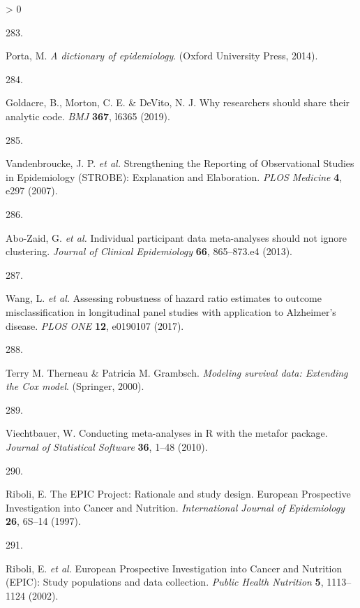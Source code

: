 \documentclass[a4paper, twoside]{templates/ociamthesis}
\newlength{\cslhangindent}
\newlength{\csllabelwidth}
\newenvironment{CSLReferences}[3] %
 {%
  \setlength{\parindent}{0pt}
  \ifodd #1 \everypar{\setlength{\hangindent}{\cslhangindent}}\ignorespaces\fi
  \ifnum #2 > 0
  \setlength{\parskip}{#2\baselineskip}
  \fi
 }%
 {}
\newcommand{\CSLLeftMargin}[1]{\parbox[t]{\maxof{\widthof{#1}}{\csllabelwidth}}{#1}}
\newcommand{\CSLRightInline}[1]{\parbox[t]{\linewidth - \csllabelwidth}{#1}}
\begin{document}
\begin{CSLReferences}{0}{0}
\leavevmode\hypertarget{ref-porta2014dictionary}{}%
\CSLLeftMargin{283. }
\CSLRightInline{Porta, M. \emph{A dictionary of epidemiology}. ({Oxford University Press}, 2014).}

\leavevmode\hypertarget{ref-goldacre2019c}{}%
\CSLLeftMargin{284. }
\CSLRightInline{Goldacre, B., Morton, C. E. \& DeVito, N. J. Why researchers should share their analytic code. \emph{BMJ} \textbf{367}, l6365 (2019).}

\leavevmode\hypertarget{ref-vandenbroucke2007}{}%
\CSLLeftMargin{285. }
\CSLRightInline{Vandenbroucke, J. P. \emph{et al.} Strengthening the {Reporting} of {Observational Studies} in {Epidemiology} ({STROBE}): {Explanation} and {Elaboration}. \emph{PLOS Medicine} \textbf{4}, e297 (2007).}

\leavevmode\hypertarget{ref-abo-zaid2013}{}%
\CSLLeftMargin{286. }
\CSLRightInline{Abo-Zaid, G. \emph{et al.} Individual participant data meta-analyses should not ignore clustering. \emph{Journal of Clinical Epidemiology} \textbf{66}, 865--873.e4 (2013).}

\leavevmode\hypertarget{ref-wang2017}{}%
\CSLLeftMargin{287. }
\CSLRightInline{Wang, L. \emph{et al.} Assessing robustness of hazard ratio estimates to outcome misclassification in longitudinal panel studies with application to {Alzheimer}'s disease. \emph{PLOS ONE} \textbf{12}, e0190107 (2017).}

\leavevmode\hypertarget{ref-survival-book}{}%
\CSLLeftMargin{288. }
\CSLRightInline{Terry M. Therneau \& Patricia M. Grambsch. \emph{Modeling survival data: {Extending} the {Cox} model}. ({Springer}, 2000).}

\leavevmode\hypertarget{ref-viechtbauer2010a}{}%
\CSLLeftMargin{289. }
\CSLRightInline{Viechtbauer, W. Conducting meta-analyses in {R} with the metafor package. \emph{Journal of Statistical Software} \textbf{36}, 1--48 (2010).}

\leavevmode\hypertarget{ref-riboli1997}{}%
\CSLLeftMargin{290. }
\CSLRightInline{Riboli, E. The {EPIC Project}: Rationale and study design. {European Prospective Investigation} into {Cancer} and {Nutrition}. \emph{International Journal of Epidemiology} \textbf{26}, 6S--14 (1997).}

\leavevmode\hypertarget{ref-riboli2002}{}%
\CSLLeftMargin{291. }
\CSLRightInline{Riboli, E. \emph{et al.} European {Prospective Investigation} into {Cancer} and {Nutrition} ({EPIC}): Study populations and data collection. \emph{Public Health Nutrition} \textbf{5}, 1113--1124 (2002).}


\end{CSLReferences}
\end{document}
